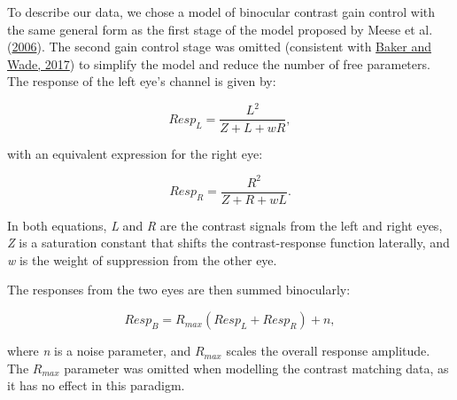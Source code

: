 \documentclass[
]{article}
\begin{document}
To describe our data, we chose a model of binocular contrast gain control with the same general form as the first stage of the model proposed by Meese et al. (\protect\hyperlink{ref-Meese2006}{2006}). The second gain control stage was omitted (consistent with \protect\hyperlink{ref-Baker2017}{Baker and Wade, 2017}) to simplify the model and reduce the number of free parameters. The response of the left eye's channel is given by:

\begin{equation}
\label{eq:respL}
Resp_L = \frac{L^2}{Z + L + wR},
\end{equation}

with an equivalent expression for the right eye:

\begin{equation}
\label{eq:respR}
Resp_R = \frac{R^2}{Z + R + wL}.
\end{equation}

In both equations, \emph{L} and \emph{R} are the contrast signals from the left and right eyes, \emph{Z} is a saturation constant that shifts the contrast-response function laterally, and \emph{w} is the weight of suppression from the other eye.

The responses from the two eyes are then summed binocularly:

\begin{equation}
\label{eq:respB}
Resp_B = R_{max}(Resp_L + Resp_R) + n,
\end{equation}

where \emph{n} is a noise parameter, and \(R_{max}\) scales the overall response amplitude. The \(R_{max}\) parameter was omitted when modelling the contrast matching data, as it has no effect in this paradigm.
\end{document}
